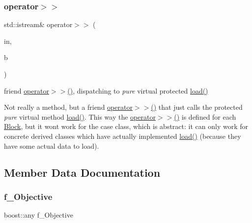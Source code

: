\subsubsection{\texorpdfstring{operator$>$$>$}{operator>>}}
{\footnotesize\ttfamily std\+::istream\& operator$>$$>$ (\begin{DoxyParamCaption}\item[{std\+::istream \&}]{in,  }\item[{\mbox{\hyperlink{class_s_m_spp__di__unipi__it_1_1_block}{Block}} \&}]{b }\end{DoxyParamCaption})\hspace{0.3cm}{\ttfamily [friend]}}



friend \mbox{\hyperlink{class_s_m_spp__di__unipi__it_1_1_block_a7124899e39ee61687c43c1061d3a0353}{operator$>$$>$()}}, dispatching to {\itshape pure} virtual protected \mbox{\hyperlink{class_s_m_spp__di__unipi__it_1_1_block_a27ae9e4279482d52342c7958c34a43c6}{load()}} 

Not really a method, but a friend \mbox{\hyperlink{class_s_m_spp__di__unipi__it_1_1_block_a7124899e39ee61687c43c1061d3a0353}{operator$>$$>$()}} that just calls the protected {\itshape pure} virtual method \mbox{\hyperlink{class_s_m_spp__di__unipi__it_1_1_block_a27ae9e4279482d52342c7958c34a43c6}{load()}}. This way the \mbox{\hyperlink{class_s_m_spp__di__unipi__it_1_1_block_a7124899e39ee61687c43c1061d3a0353}{operator$>$$>$()}} is defined for each \mbox{\hyperlink{class_s_m_spp__di__unipi__it_1_1_block}{Block}}, but it won\textquotesingle{}t work for the case class, which is abstract\+: it can only work for concrete derived classes which have actually implemented \mbox{\hyperlink{class_s_m_spp__di__unipi__it_1_1_block_a27ae9e4279482d52342c7958c34a43c6}{load()}} (because they have some actual data to load). 

\subsection{Member Data Documentation}
\mbox{\label{class_s_m_spp__di__unipi__it_1_1_block_a0c9ca72915ad1c6411af78dfd4a9b1a9}} 
\subsubsection{\texorpdfstring{f\+\_\+\+Objective}{f\_Objective}}
{\footnotesize\ttfamily boost\+::any f\+\_\+\+Objective\hspace{0.3cm}{\ttfamily [private]}}



